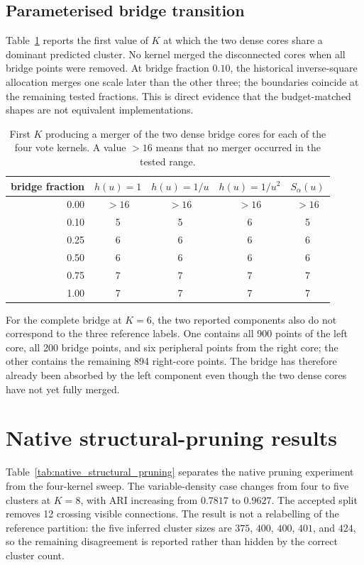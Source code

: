 \documentclass[pdflatex,sn-mathphys-num]{sn-jnl}
\begin{document}
\subsection{Parameterised bridge transition}

Table~\ref{tab:bridge_transition} reports the first value of $K$ at which the two dense cores share a dominant predicted cluster. No kernel merged the disconnected cores when all bridge points were removed. At bridge fraction $0.10$, the historical inverse-square allocation merges one scale later than the other three; the boundaries coincide at the remaining tested fractions. This is direct evidence that the budget-matched shapes are not equivalent implementations.

\begin{table}[t]
\caption{First $K$ producing a merger of the two dense bridge cores for each of
the four vote kernels. A value $>16$ means that no merger occurred in the
tested range.}\label{tab:bridge_transition}
\centering
\begin{tabular}{rcccc}
\toprule
bridge fraction & $h(u)=1$ & $h(u)=1/u$ & $h(u)=1/u^2$ & $S_\alpha(u)$\\
\midrule
0.00 & $>16$ & $>16$ & $>16$ & $>16$\\
0.10 & 5 & 5 & 6 & 5\\
0.25 & 6 & 6 & 6 & 6\\
0.50 & 6 & 6 & 6 & 6\\
0.75 & 7 & 7 & 7 & 7\\
1.00 & 7 & 7 & 7 & 7\\
\bottomrule
\end{tabular}
\end{table}

For the complete bridge at $K=6$, the two reported components also do not
correspond to the three reference labels.  One contains all 900 points of the
left core, all 200 bridge points, and six peripheral points from the right
core; the other contains the remaining 894 right-core points.  The bridge has
therefore already been absorbed by the left component even though the two dense
cores have not yet fully merged.

\section{Native structural-pruning results}
\label{sec:structural_pruning_results}

Table~\ref{tab:native_structural_pruning} separates the native pruning
experiment from the four-kernel sweep.  The variable-density case changes from
four to five clusters at $K=8$, with ARI increasing from $0.7817$ to $0.9627$.
The accepted split removes 12 crossing visible connections.  The result is not
a relabelling of the reference partition: the five inferred cluster sizes are
$375$, $400$, $400$, $401$, and $424$, so the remaining disagreement is
reported rather than hidden by the correct cluster count.
\end{document}
